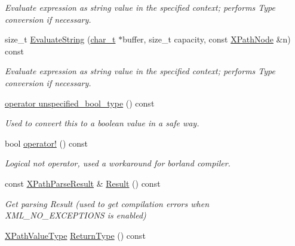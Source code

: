 \begin{DoxyCompactItemize}
\begin{DoxyCompactList}\small\item\em Evaluate expression as string value in the specified context; performs Type conversion if necessary. \item\end{DoxyCompactList}\item 
size\_\-t \hyperlink{classphys_1_1xml_1_1XPathQuery_ac9f4705c639cbd7f3aef8266fa683cc2}{EvaluateString} (\hyperlink{namespacephys_1_1xml_afc87705cd1c2917d87b879715a2d8f6e}{char\_\-t} $\ast$buffer, size\_\-t capacity, const \hyperlink{classphys_1_1xml_1_1XPathNode}{XPathNode} \&n) const 
\begin{DoxyCompactList}\small\item\em Evaluate expression as string value in the specified context; performs Type conversion if necessary. \item\end{DoxyCompactList}\item 
\hyperlink{classphys_1_1xml_1_1XPathQuery_a1c6a8e78133a177792ade031f4ed0a89}{operator unspecified\_\-bool\_\-type} () const 
\begin{DoxyCompactList}\small\item\em Used to convert this to a boolean value in a safe way. \item\end{DoxyCompactList}\item 
bool \hyperlink{classphys_1_1xml_1_1XPathQuery_afe0b62e0ab607855f5267b0690bda33b}{operator!} () const 
\begin{DoxyCompactList}\small\item\em Logical not operator, used a workaround for borland compiler. \item\end{DoxyCompactList}\item 
const \hyperlink{structphys_1_1xml_1_1XPathParseResult}{XPathParseResult} \& \hyperlink{classphys_1_1xml_1_1XPathQuery_a83f2039e91105c9cd0dcc7d524359198}{Result} () const 
\begin{DoxyCompactList}\small\item\em Get parsing Result (used to get compilation errors when XML\_\-NO\_\-EXCEPTIONS is enabled) \item\end{DoxyCompactList}\item 
\hyperlink{namespacephys_1_1xml_a339b9eef674ba44100110e5524bc575d}{XPathValueType} \hyperlink{classphys_1_1xml_1_1XPathQuery_af4c6025009b1e09cdf56124a047ca4f0}{ReturnType} () const 

\end{DoxyCompactItemize}
